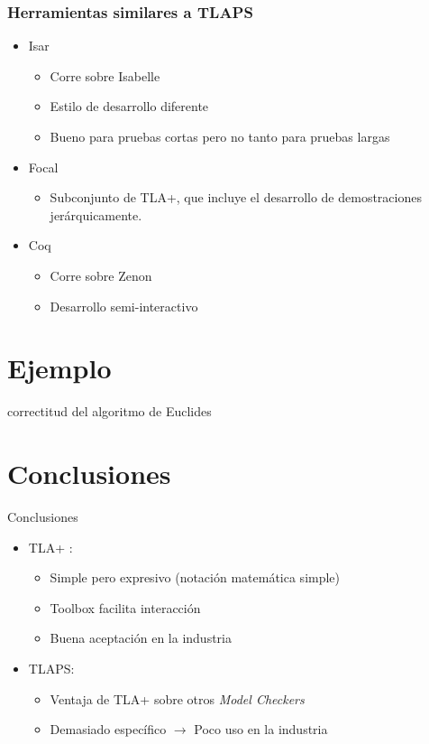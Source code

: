 \documentclass[12pt,center]{beamer}
\newenvironment{stepitemize}{\begin{itemize}[<+->]}{\end{itemize} }
\begin{document}
\begin{frame}

  \frametitle{Herramientas similares a TLAPS}
  \begin{stepitemize}
	  \item Isar
	  \begin{itemize}
	    \item Corre sobre Isabelle
	    \item Estilo de desarrollo diferente
	    \item Bueno para pruebas cortas pero no tanto para pruebas largas
	   \end{itemize}
	   \item Focal
	    \begin{itemize}
	     \item Subconjunto de TLA+, que incluye el desarrollo de demostraciones jerárquicamente. 
	    \end{itemize}
	   \item Coq
	   \begin{itemize}
	    \item Corre sobre Zenon
	    \item Desarrollo semi-interactivo
	   \end{itemize}

	    

  \end{stepitemize}


\end{frame}

\section{Ejemplo}
\begin{frame}
correctitud del algoritmo de Euclides
\end{frame}

\section{Conclusiones}
\begin{frame}{Conclusiones}
  \begin{stepitemize}
  \item TLA+ : 
  	   \begin{itemize}
	    \item Simple pero expresivo (notación matemática simple)
	    \item Toolbox facilita interacción
	    \item Buena aceptación en la industria
	   \end{itemize}
  \item TLAPS: 
    	   \begin{itemize}
	    \item Ventaja de TLA+ sobre otros \textit{Model Checkers}
	    \item Demasiado específico $\rightarrow$ Poco uso en la industria
	   \end{itemize}
  \end{stepitemize}
\end{frame}
\end{document}
